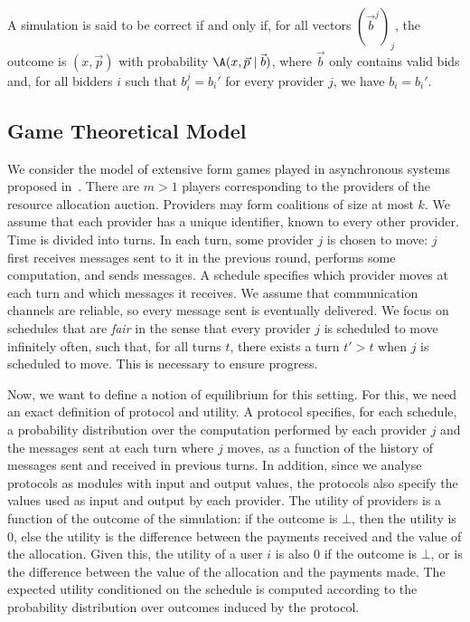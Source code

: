 \begin{definition}
A simulation is said to be correct if and only if,
for all vectors $(\vec{b}^j)_j$, the outcome is $(x,\vec{p})$ with
probability $\A(x,\vec{p} \mid \vec{b})$, where $\vec{b}$
only contains valid bids and, for all bidders $i$ such that 
$b_i^j = b_i'$ for every provider $j$, we have $b_i = b_i'$.
\end{definition}

\subsection{Game Theoretical Model}
We consider the model of extensive form games played in 
asynchronous systems proposed in~\cite{Abraham2013}.
There are $m > 1$ players corresponding to the providers 
of the resource allocation auction.
Providers may form coalitions of size at most $k$. 
We assume that each provider has a unique identifier,
known to every other provider. Time is divided into turns.
In each turn, some provider $j$ is chosen to move:
$j$ first receives messages sent to it in the previous round,
performs some computation, and sends messages.
A schedule specifies which provider moves at each turn
and which messages it receives.
We assume that communication channels are reliable,
so every message sent is eventually delivered.
We focus on schedules that are \emph{fair} in the sense
that every provider $j$ is scheduled to move infinitely
often, such that, for all turns $t$, there exists a turn $t'>t$
when $j$ is scheduled to move. This is necessary to ensure progress.

Now, we want to define a notion of equilibrium for this setting.
For this, we need an exact definition of protocol and utility.
A protocol specifies, for each schedule, a probability distribution over
the computation performed by each provider $j$ and the messages sent at each turn where $j$ moves,
as a function of the history of messages sent and received in previous turns.
In addition, since we analyse protocols as modules with input and output values,
the protocols also specify the values used as input and output by each provider.
The utility of providers is a function of the outcome of the simulation:
if the outcome is $\bot$, then the utility is $0$, else the
utility is the difference between the payments received and the value of the allocation.
Given this, the utility of a user $i$ is also $0$ if the outcome is $\bot$,
or is the difference between the value of the allocation and the payments made.
The expected utility conditioned on the schedule is
computed according to the probability distribution over outcomes induced by the protocol.

